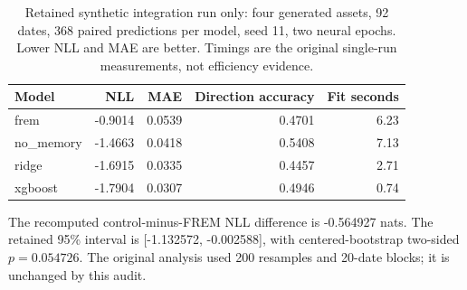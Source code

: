\begin{table}[ht]
\centering\small
\begin{tabular}{lrrrr}
\toprule Model & NLL & MAE & Direction accuracy & Fit seconds \\
\midrule
frem & -0.9014 & 0.0539 & 0.4701 & 6.23 \\
no\_memory & -1.4663 & 0.0418 & 0.5408 & 7.13 \\
ridge & -1.6915 & 0.0335 & 0.4457 & 2.71 \\
xgboost & -1.7904 & 0.0307 & 0.4946 & 0.74 \\
\bottomrule
\end{tabular}
\caption{Retained synthetic integration run only: four generated assets, 92 dates, 368 paired predictions per model, seed 11, two neural epochs. Lower NLL and MAE are better. Timings are the original single-run measurements, not efficiency evidence.}
\label{tab:engineering}
\end{table}
The recomputed control-minus-FREM NLL difference is -0.564927 nats. The retained 95\% interval is [-1.132572, -0.002588], with centered-bootstrap two-sided $p=0.054726$. The original analysis used 200 resamples and 20-date blocks; it is unchanged by this audit.
